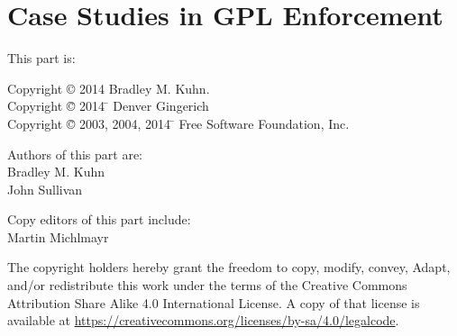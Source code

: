 





\part{Case Studies in GPL Enforcement}

{\parindent 0in
This part is: \\
\begin{tabbing}
Copyright \> \copyright{} 2014 \>  Bradley M. Kuhn. \\
Copyright \= \copyright{} 2014 \= \hspace{.2in} Denver Gingerich \\
Copyright \= \copyright{} 2003, 2004, 2014 \= \hspace{.2in} Free Software Foundation, Inc. \\
\end{tabbing}

\vspace{1in}

\begin{center}
Authors of this part are: \\

Bradley M. Kuhn \\
John Sullivan
\vspace{3in}

Copy editors of this part include: \\
Martin Michlmayr

\vspace{3in}

The copyright holders hereby grant the freedom to copy, modify, convey,
Adapt, and/or redistribute this work under the terms of the Creative Commons
Attribution Share Alike 4.0 International License.  A copy of that license is
available at \url{https://creativecommons.org/licenses/by-sa/4.0/legalcode}.
\end{center}
}

